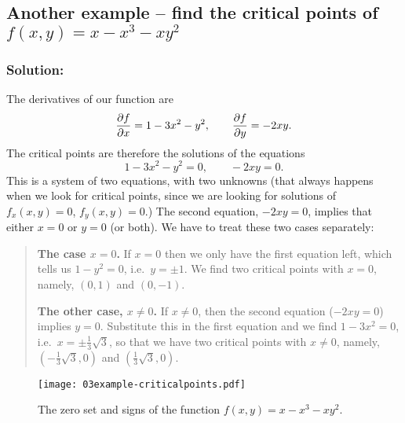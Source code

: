 \subsection{Another example -- find the critical points of $f(x,y) =x-x^3-xy^2$}

\subsubsection*{Solution: } The derivatives of our function are
\[
\frac{\partial f}{\partial x} = 1-3x^2-y^2,\qquad \frac{\partial f}{\partial y} = -2xy.
\]
The critical points are therefore the solutions of the equations
\[
1-3x^2-y^2=0,\qquad -2xy=0.
\]
This is a system of two equations, with two unknowns (that always happens when
we look for critical points, since we are looking for solutions of $f_x(x,y) =
0$, $f_y(x,y)=0$.)  The second equation, $-2xy=0$, implies that either $x=0$ or
$y=0$ (or both).  We have to treat these two cases separately:
\begin{quote}
  \begin{trivlist}
  \item [\bf The case $x=0$. ] If $x=0$ then we only have the first equation
    left, which tells us $1-y^2=0$, i.e.\ $y=\pm1$.  We find two critical points
    with $x=0$, namely, $(0,1)$ and $(0,-1)$.
  \item [\bf The other case, $x\neq0$. ] If $x\neq0$, then the second equation
    ($-2xy=0$) implies $y=0$.  Substitute this in the first equation and we find
    $1-3x^2=0$, i.e.\ $x=\pm\frac{1} {3}\sqrt{3}$, so that we have two critical
    points with $x\neq0$, namely, $(-\frac13\sqrt3, 0)$ and $(\frac13\sqrt3,
    0)$.
  \end{trivlist}
\end{quote}

\begin{figure}[h]
  \centering
  \texttt{[image: 03example-criticalpoints.pdf]}
  \caption{The zero set and signs of the function $f(x,y) =x-x^3-xy^2$.}
  \label{fig:circle-and-line-zero-set-example}
\end{figure}


